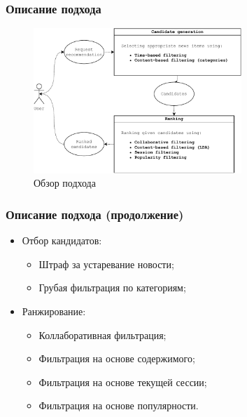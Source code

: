 \documentclass[xetex,mathserif,serif]{beamer}
\begin{document}
\begin{frame}
	\frametitle{Описание подхода}

    \begin{figure}[h]
        \includegraphics[width=0.7\textwidth]{./images/architechture.pdf}
        \caption{Обзор подхода}
        \label{fig:arch}
        \centering
    \end{figure}

\end{frame}

\begin{frame}
    \frametitle{Описание подхода (продолжение)}

	\begin{itemize}
        \item Отбор кандидатов:
            \begin{itemize}
                \item Штраф за устаревание новости;
                \item Грубая фильтрация по категориям;
            \end{itemize}
        \item Ранжирование:
            \begin{itemize}
                \item Коллаборативная фильтрация;
                \item Фильтрация на основе содержимого;
                \item Фильтрация на основе текущей сессии;
                \item Фильтрация на основе популярности.
            \end{itemize}
	\end{itemize}
\end{frame}
\end{document}
